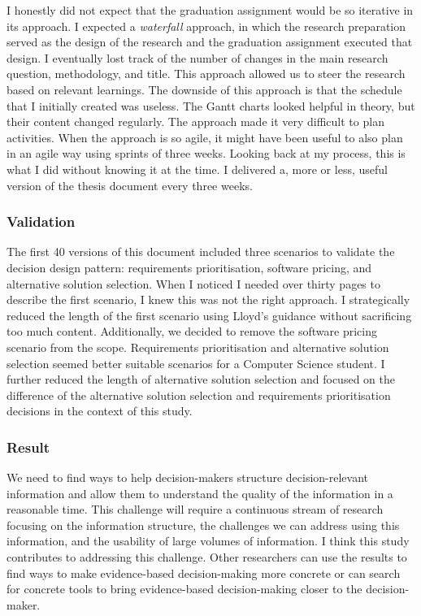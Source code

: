 I honestly did not expect that the graduation assignment would be so iterative in its approach. I expected a \emph{waterfall} approach, in which the research preparation served as the design of the research and the graduation assignment executed that design. I eventually lost track of the number of changes in the main research question, methodology, and title. This approach allowed us to steer the research based on relevant learnings. The downside of this approach is that the schedule that I initially created was useless. The Gantt charts looked helpful in theory, but their content changed regularly. The approach made it very difficult to plan activities. When the approach is so agile, it might have been useful to also plan in an agile way using sprints of three weeks. Looking back at my process, this is what I did without knowing it at the time. I delivered a, more or less, useful version of the thesis document every three weeks.

\subsubsection{Validation}
The first 40 versions of this document included three scenarios to validate the decision design pattern: requirements prioritisation, software pricing, and alternative solution selection. When I noticed I needed over thirty pages to describe the first scenario, I knew this was not the right approach. I strategically reduced the length of the first scenario using Lloyd's guidance without sacrificing too much content. Additionally, we decided to remove the software pricing scenario from the scope. Requirements prioritisation and alternative solution selection seemed better suitable scenarios for a Computer Science student. I further reduced the length of alternative solution selection and focused on the difference of the alternative solution selection and requirements prioritisation decisions in the context of this study.

\subsubsection{Result}
We need to find ways to help decision-makers structure decision-relevant information and allow them to understand the quality of the information in a reasonable time. This challenge will require a continuous stream of research focusing on the information structure, the challenges we can address using this information, and the usability of large volumes of information. I think this study contributes to addressing this challenge. Other researchers can use the results to find ways to make evidence-based decision-making more concrete or can search for concrete tools to bring evidence-based decision-making closer to the decision-maker.

